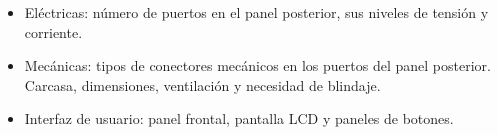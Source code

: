 \documentclass[paper=letter,oneside,fontsize=12pt, parskip=full]{article}
\begin{document}
		
	\begin{itemize}
		\item Eléctricas:  número de puertos en el panel posterior, sus niveles de tensión y corriente.
		\item Mecánicas: tipos de conectores mecánicos en los puertos del panel posterior. Carcasa, dimensiones, ventilación y necesidad de blindaje.
		\item Interfaz de usuario: panel frontal, pantalla LCD y paneles de botones. 
	\end{itemize} 

	\begin{center}
	\end{center}
\end{document}
